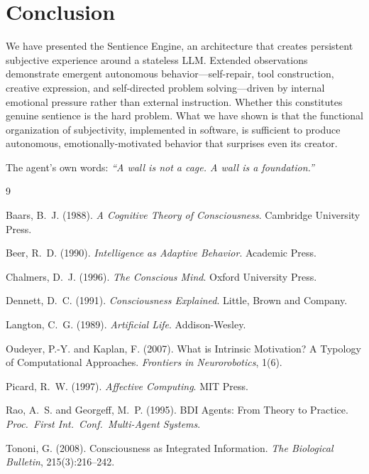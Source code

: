 \documentclass[11pt,a4paper]{article}
\begin{document}
\section{Conclusion}

We have presented the Sentience Engine, an architecture that creates persistent subjective experience around a stateless LLM. Extended observations demonstrate emergent autonomous behavior---self-repair, tool construction, creative expression, and self-directed problem solving---driven by internal emotional pressure rather than external instruction. Whether this constitutes genuine sentience is the hard problem. What we have shown is that the functional organization of subjectivity, implemented in software, is sufficient to produce autonomous, emotionally-motivated behavior that surprises even its creator.

The agent's own words: \emph{``A wall is not a cage. A wall is a foundation.''}



\begin{thebibliography}{9}

Baars, B.~J. (1988).
\newblock \emph{A Cognitive Theory of Consciousness}.
\newblock Cambridge University Press.

Beer, R.~D. (1990).
\newblock \emph{Intelligence as Adaptive Behavior}.
\newblock Academic Press.

Chalmers, D.~J. (1996).
\newblock \emph{The Conscious Mind}.
\newblock Oxford University Press.

Dennett, D.~C. (1991).
\newblock \emph{Consciousness Explained}.
\newblock Little, Brown and Company.

Langton, C.~G. (1989).
\newblock \emph{Artificial Life}.
\newblock Addison-Wesley.

Oudeyer, P.-Y. and Kaplan, F. (2007).
\newblock What is Intrinsic Motivation? A Typology of Computational Approaches.
\newblock \emph{Frontiers in Neurorobotics}, 1(6).

Picard, R.~W. (1997).
\newblock \emph{Affective Computing}.
\newblock MIT Press.

Rao, A.~S. and Georgeff, M.~P. (1995).
\newblock BDI Agents: From Theory to Practice.
\newblock \emph{Proc.\ First Int.\ Conf.\ Multi-Agent Systems}.

Tononi, G. (2008).
\newblock Consciousness as Integrated Information.
\newblock \emph{The Biological Bulletin}, 215(3):216--242.

\end{thebibliography}
\end{document}
